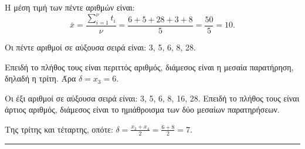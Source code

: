 
\begin{alist}
    \item Η μέση τιμή των πέντε αριθμών είναι:
    \[ \bar{x} = \frac{\sum_{i=1}^{\nu} t_i}{\nu} = \frac{6+5+28+3+8}{5} = \frac{50}{5} = 10. \]

    \item Οι πέντε αριθμοί σε αύξουσα σειρά είναι: 3, 5, 6, 8, 28.

    Επειδή το πλήθος τους είναι περιττός αριθμός, διάμεσος είναι η μεσαία παρατήρηση, δηλαδή η τρίτη. Άρα $\delta = x_3 = 6$.

    \item Οι έξι αριθμοί σε αύξουσα σειρά είναι: 3, 5, 6, 8, 16, 28. Επειδή το πλήθος τους είναι άρτιος αριθμός, διάμεσος είναι το ημιάθροισμα των δύο μεσαίων παρατηρήσεων.

    Της τρίτης και τέταρτης, οπότε: $\delta = \frac{x_3 + x_4}{2} = \frac{6+8}{2} = 7$.
\end{alist}
\vspace{6mm}
\noindent\rule{\textwidth}{0.4pt}
\vspace{6mm}

